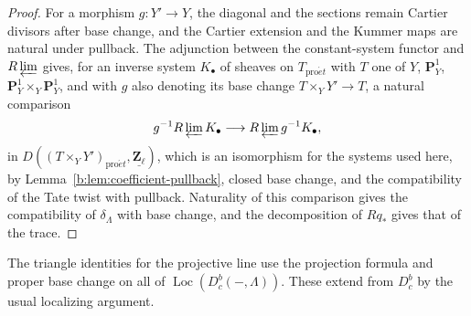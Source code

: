 \documentclass[11pt,a4paper]{article}
\numberwithin{equation}{section}
\theoremstyle{definition}
\theoremstyle{remark}
\newcommand{\Dbc}{D^b_c}
\newcommand{\Loc}{\operatorname{Loc}}
\newcommand{\proet}{\mathrm{pro}\acute{e}t}
\begin{document}
\begin{proof}
For a morphism $g:Y'\to Y$, the diagonal and the sections remain Cartier
divisors after base change, and the Cartier extension and the Kummer
maps are natural under pullback. The adjunction between the
constant-system functor and $R\varprojlim$ gives, for an inverse
system $K_\bullet$ of sheaves on $T_{\proet}$ with $T$ one of
$Y$, $\mathbf P^1_Y$, $\mathbf P^1_Y\times_Y\mathbf P^1_Y$, and with $g$
also denoting its base change $T\times_YY'\to T$, a natural comparison
\[
 g^{-1}R\varprojlim K_\bullet\longrightarrow
                          R\varprojlim g^{-1}K_\bullet,
\]
in $D((T\times_YY')_{\proet},\underline{\mathbf Z_\ell})$, which is an isomorphism for the systems used here, by
Lemma~\ref{b:lem:coefficient-pullback}, closed base change, and the
compatibility of the Tate twist with pullback. Naturality of this
comparison gives the compatibility of $\delta_\Lambda$ with base change,
and the decomposition of $Rq_*$ gives that of the trace.
\end{proof}

The triangle identities for the projective line use the projection
formula and proper base change on all of $\Loc(\Dbc(-,\Lambda))$. These
extend from $\Dbc$ by the usual localizing argument.
\end{document}
